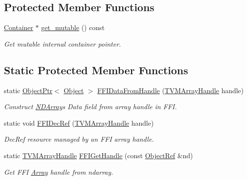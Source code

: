 \subsection*{Protected Member Functions}
\begin{DoxyCompactItemize}
\item 
\hyperlink{classtvm_1_1runtime_1_1NDArray_1_1Container}{Container} $\ast$ \hyperlink{classtvm_1_1runtime_1_1NDArray_a87268f39e0b14b18fee24d30c0f0ad95}{get\+\_\+mutable} () const 
\begin{DoxyCompactList}\small\item\em Get mutable internal container pointer. \end{DoxyCompactList}\end{DoxyCompactItemize}
\subsection*{Static Protected Member Functions}
\begin{DoxyCompactItemize}
\item 
static \hyperlink{classtvm_1_1runtime_1_1ObjectPtr}{Object\+Ptr}$<$ \hyperlink{classtvm_1_1runtime_1_1Object}{Object} $>$ \hyperlink{classtvm_1_1runtime_1_1NDArray_ab76ba9c638e1d6db8d6f0ba8c4d38670}{F\+F\+I\+Data\+From\+Handle} (\hyperlink{c__runtime__api_8h_a73ca58cb32f4a4adf71d274dc1e27be4}{T\+V\+M\+Array\+Handle} handle)
\begin{DoxyCompactList}\small\item\em Construct \hyperlink{classtvm_1_1runtime_1_1NDArray}{N\+D\+Array}\textquotesingle{}s Data field from array handle in F\+FI. \end{DoxyCompactList}\item 
static void \hyperlink{classtvm_1_1runtime_1_1NDArray_ade0e2757904f4f5ba5c667ae01793a47}{F\+F\+I\+Dec\+Ref} (\hyperlink{c__runtime__api_8h_a73ca58cb32f4a4adf71d274dc1e27be4}{T\+V\+M\+Array\+Handle} handle)
\begin{DoxyCompactList}\small\item\em Dec\+Ref resource managed by an F\+FI array handle. \end{DoxyCompactList}\item 
static \hyperlink{c__runtime__api_8h_a73ca58cb32f4a4adf71d274dc1e27be4}{T\+V\+M\+Array\+Handle} \hyperlink{classtvm_1_1runtime_1_1NDArray_a141e032d848c60f8261046304bdc8c4c}{F\+F\+I\+Get\+Handle} (const \hyperlink{classtvm_1_1runtime_1_1ObjectRef}{Object\+Ref} \&nd)
\begin{DoxyCompactList}\small\item\em Get F\+FI \hyperlink{classtvm_1_1Array}{Array} handle from ndarray. \end{DoxyCompactList}\end{DoxyCompactItemize}
